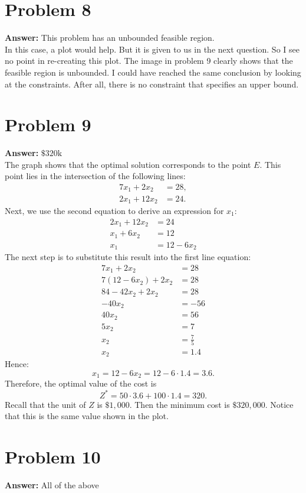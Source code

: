 \documentclass[11pt]{article}
\begin{document}
\section*{Problem 8}
\label{sec:orge1322c1}

\textbf{Answer:} This problem has an unbounded feasible region.\\

In this case, a plot would help. But it is given to us in the next question. So
I see no point in re-creating this plot. The image in problem 9 clearly shows
that the feasible region is unbounded. I could have reached the same conclusion
by looking at the constraints. After all, there is no constraint that specifies
an upper bound.
\section*{Problem 9}
\label{sec:orgea6bbe4}

\textbf{Answer:} \(\$ 320\mathrm{k}\)\\

The graph shows that the optimal solution corresponds to the point \(E\). This
point lies in the intersection of the following lines:
\begin{align*}
  7x_1+2x_2&=28,\\
  2x_1+12x_2&=24.
\end{align*}
Next, we use the second equation to derive an expression for \(x_1\):
\begin{align*}
  2x_1+12x_2&=24\\
  x_1+6x_2&=12\\
  x_1&=12-6x_2
\end{align*}
The next step is to substitute this result into the first line equation:
\begin{align*}
  7x_1+2x_2&=28\\
  7(12-6x_2)+2x_2&=28\\
  84-42x_2+2x_2&=28\\
  -40x_2&=-56\\
  40x_2&=56\\
  5x_2&=7\\
  x_2&=\frac{7}{5}\\
  x_2&=1.4
\end{align*}
Hence:
\begin{equation*}
x_1=12-6x_2=12-6\cdot 1.4=3.6.
\end{equation*}
Therefore, the optimal value of the cost is
\begin{equation}
Z^{*}=50\cdot 3.6+100\cdot 1.4=320.
\end{equation}
Recall that the unit of \(Z\) is \(\$ 1,000\). Then the minimum cost is
\(\$ 320,000\). Notice that this is the same value shown in the plot.
\section*{Problem 10}
\label{sec:org1182645}

\textbf{Answer:} All of the above
\end{document}

